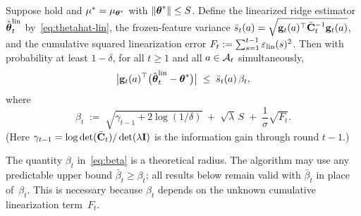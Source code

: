 \documentclass[twoside]{article}
\begin{document}
\begin{lemma}%
\label{lem:confidence}
Suppose  hold and
$\mu^*=\mu_{\boldsymbol{\theta}^*}$ with $\|\boldsymbol{\theta}^*\|\le S$.
Define the linearized ridge estimator~$\hat{\boldsymbol{\theta}}_t^{\mathrm{lin}}$
by~\eqref{eq:thetahat-lin}, the frozen-feature variance
$\bar s_t(a)=\sqrt{\mathbf{g}_t(a)^\top\bar{\mathbf{C}}_t^{-1}\mathbf{g}_t(a)}$, and
the cumulative squared linearization error
$F_t := \sum_{s=1}^{t-1}\varepsilon_{\mathrm{lin}}(s)^2$.
Then with probability at least $1-\delta$, for all $t\ge 1$ and all
$a\in\mathcal{A}_t$ simultaneously,
\begin{equation}\label{eq:conf-lin}
  \bigl|\mathbf{g}_t(a)^\top
    \bigl(\hat{\boldsymbol{\theta}}_t^{\mathrm{lin}}-\boldsymbol{\theta}^*\bigr)\bigr|
  \;\le\;
  \bar s_t(a)\,\beta_t,
\end{equation}
where
\begin{equation}\label{eq:beta}
  \beta_t
  \;:=\;
  \sqrt{\gamma_{t-1} + 2\log(1/\delta)}
  \;+\; \sqrt{\lambda}\,S
  \;+\; \frac{1}{\sigma}\sqrt{F_t}.
\end{equation}
(Here $\gamma_{t-1}=\log\det(\bar{\mathbf{C}}_t)/\det(\lambda\mathbf{I})$ is the
information gain through round $t{-}1$.)

The quantity $\beta_t$ in~\eqref{eq:beta} is a theoretical radius.
The algorithm may use any predictable upper bound
$\bar\beta_t \ge \beta_t$; all results below remain valid with
$\bar\beta_t$ in place of~$\beta_t$.
This is necessary because $\beta_t$ depends on the unknown cumulative
linearization term~$F_t$.
\end{lemma}
\end{document}
